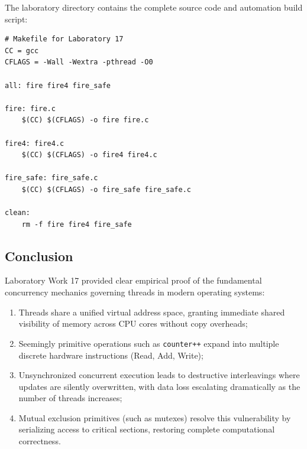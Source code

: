 \documentclass{labreport}
\begin{document}
The laboratory directory contains the complete source code and automation build script:

\begin{lstlisting}[style=bash]
# Makefile for Laboratory 17
CC = gcc
CFLAGS = -Wall -Wextra -pthread -O0

all: fire fire4 fire_safe

fire: fire.c
	$(CC) $(CFLAGS) -o fire fire.c

fire4: fire4.c
	$(CC) $(CFLAGS) -o fire4 fire4.c

fire_safe: fire_safe.c
	$(CC) $(CFLAGS) -o fire_safe fire_safe.c

clean:
	rm -f fire fire4 fire_safe
\end{lstlisting}

\subsection{Conclusion}
Laboratory Work 17 provided clear empirical proof of the fundamental concurrency mechanics governing threads in modern operating systems:
\begin{enumerate}[noitemsep]
    \item Threads share a unified virtual address space, granting immediate shared visibility of memory across CPU cores without copy overheads;
    \item Seemingly primitive operations such as \texttt{counter++} expand into multiple discrete hardware instructions (Read, Add, Write);
    \item Unsynchronized concurrent execution leads to destructive interleavings where updates are silently overwritten, with data loss escalating dramatically as the number of threads increases;
    \item Mutual exclusion primitives (such as mutexes) resolve this vulnerability by serializing access to critical sections, restoring complete computational correctness.
\end{enumerate}
\end{document}
